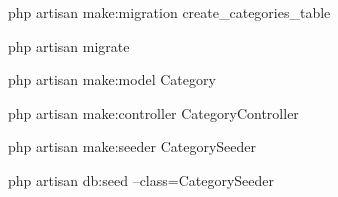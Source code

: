 php artisan make:migration create_categories_table

php artisan migrate

php artisan make:model Category


php artisan make:controller CategoryController

php artisan make:seeder CategorySeeder


php artisan db:seed --class=CategorySeeder
